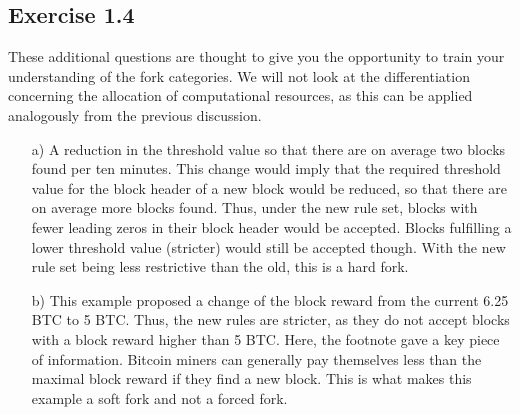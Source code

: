 \documentclass[12pt]{article}
\begin{document}
	\subsection*{Exercise 1.4}
	These additional questions are thought to give you the opportunity to train your understanding of the fork categories. We will not look at the differentiation concerning the allocation of computational resources, as this can be applied analogously from the previous discussion.
	\begin{itemize}
		\item[a)] A reduction in the threshold value so that there are on average two blocks found per ten minutes. This change would imply that the required threshold value for the block header of a new block would be reduced, so that there are on average more blocks found. Thus, under the new rule set, blocks with fewer leading zeros in their block header would be accepted. Blocks fulfilling a lower threshold value (stricter) would still be accepted though. With the new rule set being less restrictive than the old, this is a hard fork.
		\item[b)] This example proposed a change of the block reward from the current 6.25 BTC to 5 BTC. Thus, the new rules are stricter, as they do not accept blocks with a block reward higher than 5 BTC. Here, the footnote gave a key piece of information. Bitcoin miners can generally pay themselves less than the maximal block reward if they find a new block. This is what makes this example a soft fork and not a forced fork.
	\end{itemize}
	
\end{document}
